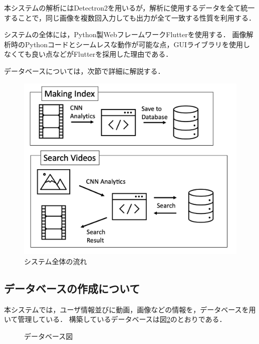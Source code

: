 \documentclass[a4j,12pt,dvipdfmx]{jreport}
\begin{document}
本システムの解析にはDetectron2を用いるが，解析に使用するデータを全て統一することで，同じ画像を複数回入力しても出力が全て一致する性質を利用する．

システムの全体には，Python製WebフレームワークFlutterを使用する．
画像解析時のPythonコードとシームレスな動作が可能な点，GUIライブラリを使用しなくても良い点などがFlutterを採用した理由である．

データベースについては，次節で詳細に解説する．

\begin{figure}[H]
  \centering
  \includegraphics[width=13cm]{image/flow.png}
  \caption{システム全体の流れ}
  \label{fig:flow}
\end{figure}

\subsection{データベースの作成について}
本システムでは，ユーザ情報並びに動画，画像などの情報を，データベースを用いて管理している．
構築しているデータベースは図\ref{fig:table_list}のとおりである．

\begin{figure}[H]
  \centering
  \caption{データベース図}
  \label{fig:table_list}
\end{figure}
\end{document}
